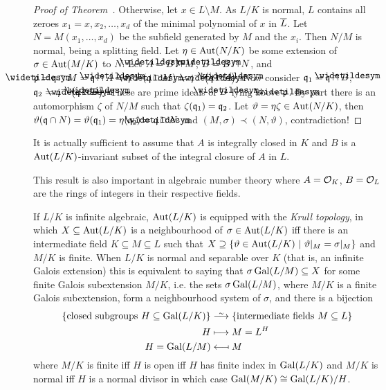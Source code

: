\documentclass[a4paper,parskip=half,numbers=enddot, DIV=12]{scrreprt}
\begin{document}
\begin{proof}[Proof of Theorem~]
		Otherwise, let $x\in L\setminus M$. As $L/K$ is normal, $L$ contains all zeroes $x_1=x,x_2,\ldots, x_d$ of the minimal polynomial of $x$ in $\overline L$. Let $N=M(x_1,\ldots,x_d)$ be the subfield generated by $M$ and the $x_i$. Then $N/M$ is normal, being a splitting field. Let $\eta\in \operatorname{Aut}(N/K)$ be some extension of $\sigma\in \operatorname{Aut}(M/K)$ to $N$. Let $\snake A = B\cap M$, $\snake B = B\cap N$, and $\snake\pp = \qq\cap M  =\qq\cap \snake A = \eta^{-1}\left(\snake \qq\cap M\right) = \eta^{-1}\big(\snake\qq\cap \snake A\big)$. Now consider $\qq_1=\qq\cap \snake B$, $\qq_2=\eta^{-1}\big(\snake \qq\cap\snake B\big)$. These are prime ideals of $\snake B$ lying above $\snake \pp$. By part  there is an automorphism $\zeta$ of $N/M$ such that $\zeta(\mathfrak{q}_1) = \mathfrak{q}_2$. Let $\vartheta = \eta\zeta\in \operatorname{Aut}(N/K)$, then $\vartheta(\qq\cap N) = \vartheta(\qq_1) = \eta(\qq_2) = \snake\qq\cap N$ and $(M,\sigma)\prec (N,\vartheta)$, contradiction!
	\end{proof}
	\begin{rem*}
		\begin{alphanumerate}
		\item
			It is actually sufficient to assume that $A$ is integrally closed in $K$ and $B$ is a $\operatorname{Aut}(L/K)$-invariant subset of the integral closure of $A$ in $L$.
		\item
			This result is also important in algebraic number theory where $A=\mathcal{O}_K$, $B=\mathcal{O}_L$ are the rings of integers in their respective fields. 
		\item If $L/K$ is infinite algebraic, $\operatorname{Aut}(L/K)$ is equipped with the \emph{Krull topology}, in which $X\subseteq \operatorname{Aut}(L/K)$ is a neighbourhood of $\sigma\in\operatorname{Aut}(L/K)$ iff there is an intermediate field $K\subseteq M\subseteq L$ such that $X\supseteq\left\{\vartheta \in \operatorname{Aut}(L/K)\ \middle|\  \vartheta|_M = \sigma|_M\right\}$ and $M/K$ is finite. When $L/K$ is normal and separable over $K$ (that is, an infinite Galois extension) this is equivalent to saying that $\sigma\operatorname{Gal}(L/M)\subseteq X$ for some finite Galois subextension $M/K$, i.e. the sets $\sigma\operatorname{Gal}(L/M)$, where $M/K$ is a finite Galois subextension, form a neighbourhood system of $\sigma$, and  there is a bijection 
		\begin{align*}
			\left\{\text{closed subgroups }H\subseteq \Gal(L/K)\right\}&\isomorphism\left\{\text{intermediate fields }M\subseteq L\right\}\\
			H&\longmapsto M= L^H\\
			H=\Gal(L/M) &\longmapsfrom M
		\end{align*}
		where $M/K$ is finite iff $H$ is open iff $H$ has finite index in $\operatorname{Gal}(L/K)$ and $M/K$ is normal iff $H$ is a normal divisor in which case $\operatorname{Gal}(M/K) \cong \operatorname{Gal}(L/K)/H$.
		\end{alphanumerate}
	\end{rem*}
\end{document}
